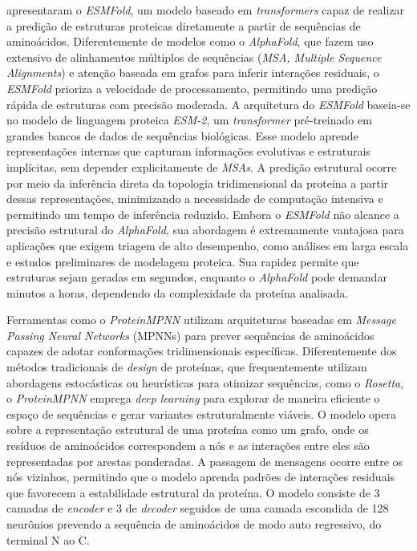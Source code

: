 \cite{ESMFold} apresentaram o \textit{ESMFold}, 
um modelo baseado em \textit{transformers} capaz de realizar a predição de estruturas proteicas diretamente 
a partir de sequências de aminoácidos. 
Diferentemente de modelos como o \textit{AlphaFold},
que fazem uso extensivo de alinhamentos múltiplos de sequências (\textit{MSA, Multiple Sequence Alignments}) e atenção
baseada em grafos para inferir interações residuais,
o \textit{ESMFold} prioriza a velocidade de processamento, permitindo uma predição rápida de estruturas com precisão moderada.  
A arquitetura do \textit{ESMFold} baseia-se no modelo de linguagem proteica \textit{ESM-2}, 
um \textit{transformer} pré-treinado em grandes bancos de dados de sequências biológicas. 
Esse modelo aprende representações internas que capturam informações evolutivas e estruturais implícitas,
sem depender explicitamente de \textit{MSAs}. 
A predição estrutural ocorre por meio da inferência direta da topologia tridimensional da proteína a partir dessas representações,
minimizando a necessidade de computação intensiva e permitindo um tempo de inferência reduzido.
Embora o \textit{ESMFold} não alcance a precisão estrutural do \textit{AlphaFold},
sua abordagem é extremamente vantajosa para aplicações que exigem triagem de alto desempenho,
como análises em larga escala e estudos preliminares de modelagem proteica. 
Sua rapidez permite que estruturas sejam geradas em segundos, 
enquanto o \textit{AlphaFold} pode demandar minutos a horas,
dependendo da complexidade da proteína analisada. 

Ferramentas como o \textit{ProteinMPNN} \cite{ProteinMPNN} utilizam arquiteturas baseadas em \textit{Message Passing Neural Networks} 
(MPNNs) para prever sequências de aminoácidos capazes de adotar conformações tridimensionais específicas.
Diferentemente dos métodos tradicionais de \textit{design} de proteínas, 
que frequentemente utilizam abordagens estocásticas ou heurísticas para otimizar sequências, como o \textit{Rosetta},
o \textit{ProteinMPNN} emprega \textit{deep learning} para explorar de maneira eficiente o espaço de sequências
e gerar variantes estruturalmente viáveis.  
O modelo opera sobre a representação estrutural de uma proteína como um grafo,
onde os resíduos de aminoácidos correspondem a nós e as interações entre eles são representadas por arestas ponderadas. 
A passagem de mensagens ocorre entre os nós vizinhos, permitindo que o modelo aprenda padrões de interações residuais 
que favorecem a estabilidade estrutural da proteína. 
O modelo consiste de 3 camadas de \textit{encoder} e 3 de \textit{decoder} seguidos de uma camada escondida de 128 neurônios 
prevendo a sequência de aminoácidos de modo auto regressivo, do terminal N ao C. 



